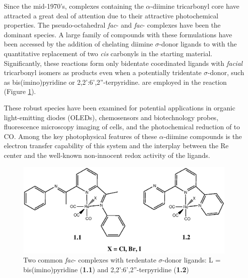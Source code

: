 Since the mid-1970's, complexes containing the $\alpha$-diimine  tricarbonyl core have attracted a great deal of attention due to their attractive photochemical properties. The pseudo-octahedral \textit{fac}-\ce{[L2Re(CO)3X]} and \textit{fac}-\ce{[L2(L$'$)Re(CO)3]+} complexes have been the dominant species\autocite{giordano1979, fredericks1979, sacksteder1990, caspar1983, yam2001, feliz1998, ruiz1996, lin1992, hino1992, walters2002, striplin2001}. A large family of compounds with these formulations have been accessed by the addition of chelating diimine $\sigma$-donor ligands to \ce{[Re(CO)5X]} with the quantitative replacement of two \textit{cis} carbonyls in the  starting material\autocite{giordano1979, martin2011, abel1959, kirkham1965, zingales1967, gamelin1994, marti2005, morse1976, giordano1978}. Significantly, these reactions form only bidentate coordinated ligands with \textit{facial} tricarbonyl isomers as products even when a potentially tridentate $\sigma$-donor, such as bis(imino)pyridine or 2,2':6',2''-terpyridine. are employed in the reaction (Figure \ref{fig.terdentateligands})\autocite{granifo1999, orrell1997, abel1993, potgieter2013}. 

These robust species have been examined for potential applications in organic light-emitting diodes (OLEDs)\autocite{gong1998, yu2013}, chemosensors and biotechnology probes\autocite{lo2010, lin2007, slone1995, beer1999, beer2003}, fluorescence microscopy imaging of cells\autocite{lo2010, amoroso2008, amoroso2007}, and the photochemical reduction of  to CO\autocite{hawecker1983, hawecker1986, takeda2010, christensen1992, sullivan1985}. Among the key photophysical features of these $\alpha$-diimine  compounds is the electron transfer capability of this system and the interplay between the Re center and the well-known non-innocent redox activity of the ligands\autocite{caulton2012, lyaskovskyy2012}.

\begin{figure}[!htbp]
 \begin{center}
  \includegraphics[clip=true, width=110mm]{images/terdentateligands.eps}
 \end{center}
\caption[Two common bidentate complexes using terdentate ligands]{Two common \textit{fac}-\ce{[L2Re(CO)3X]} complexes with terdentate $\sigma$-donor ligands: L = bis(imino)pyridine (\textbf{1.1}) and 2,2':6',2''-terpyridine (\textbf{1.2})}
\label{fig.terdentateligands}
\end{figure}

